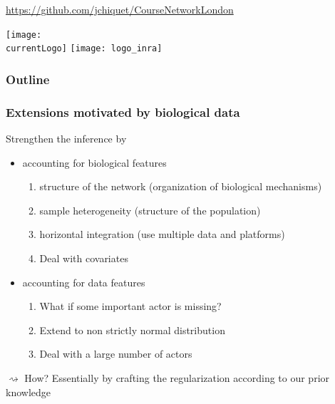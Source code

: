 \documentclass[10pt, c, xcolor=x11names]{beamer}\usepackage[]{graphicx}\usepackage[]{color}
\title{\currentCourse}
\subtitle{\huge\currentChapter\normalsize}
\institute{\currentInstitute}
\date{\currentDate}
\def\currentLogo{../common_figs/logo_imperial}
\newcommand{\dotitlepage}{%
  \begin{frame}
    \titlepage
    \vfill
    \begin{center}
        \scriptsize\url{https://github.com/jchiquet/CourseNetworkLondon}
    \end{center}
    \vfill
    \texttt{[image: \\currentLogo]}\hfill
    \texttt{[image: logo\_inra]}
  \end{frame}
}
\begin{document}
\dotitlepage



\begin{frame}
  \frametitle{Outline}
  \tableofcontents[hideallsubsections]
\end{frame}







\begin{frame}
  \frametitle{Extensions motivated by biological data}

  \begin{block}{\alert{Strengthen the inference } by}
    \vspace{-.25cm}

    \begin{itemize}
    \item accounting for biological features

      \begin{enumerate}
      \item \alert{structure} of the network (organization of biological mechanisms)
      \item sample \alert{heterogeneity} (structure of the population)
      \item horizontal \alert{integration} (use multiple data and platforms)
      \item Deal with \alert{covariates}
      \end{enumerate} 

    \item accounting for data features 

      \begin{enumerate}
      \item What if some \alert{important actor is missing}?
      \item Extend to \alert{non strictly normal} distribution
      \item Deal with a \alert{large number} of actors
      \end{enumerate}
    \end{itemize}

  $\rightsquigarrow$ How? Essentially by crafting the regularization according to our prior knowledge  

  \end{block}

\end{frame}
\end{document}
